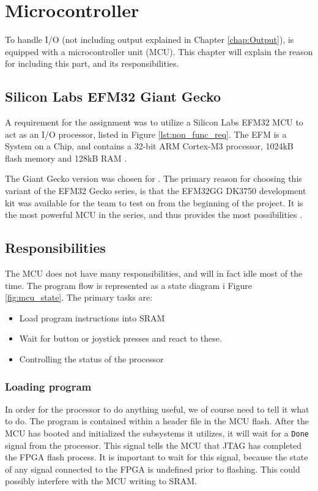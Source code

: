 \chapter{Microcontroller}

To handle I/O (not including output explained in Chapter \ref{chap:Output}), \vthreek is equipped with a microcontroller unit (MCU).
This chapter will explain the reason for including this part, and its responsibilities. 

\section{Silicon Labs EFM32 Giant Gecko}
A requirement for the assignment was to utilize a Silicon Labs EFM32 MCU to act as an I/O processor, listed in Figure \ref{lst:non_func_req}.
The EFM is a System on a Chip, and contains a 32-bit ARM Cortex-M3 processor, 1024kB flash memory and 128kB RAM \cite{efm32referencemanual}.

The Giant Gecko version was chosen for \vthreek.
The primary reason for choosing this variant of the EFM32 Gecko series, is that the EFM32GG DK3750 development kit was available for the team to test on from the beginning of the project.
It is the most powerful MCU in the series, and thus provides the most possibilities \cite{}.

\section{Responsibilities}
The MCU does not have many responsibilities, and will in fact idle most of the time. The program flow is represented as a state diagram i Figure \ref{fig:mcu_state}.
The primary tasks are: 
\begin{itemize}
\item Load program instructions into SRAM
\item Wait for button or joystick presses and react to these.
\item Controlling the status of the processor
\end{itemize}

\subsection{Loading program}
In order for the processor to do anything useful, we of course need to tell it what to do.
The program is contained within a header file in the MCU flash.
After the MCU has booted and initialized the subsystems it utilizes, it will wait for a \texttt{Done} signal from the processor.
This signal tells the MCU that JTAG has completed the FPGA flash process. 
It is important to wait for this signal, because the state of any signal connected to the FPGA is undefined prior to flashing.
This could possibly interfere with the MCU writing to SRAM.

